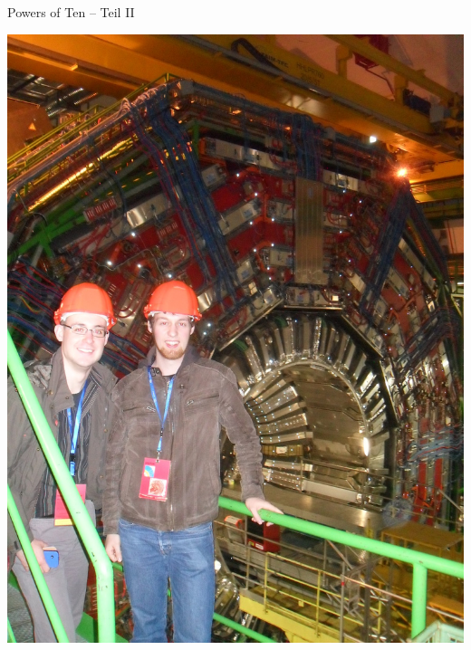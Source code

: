 \documentclass[14pt]{beamer}
\begin{document}
%
\begin{frame}
	\centering
	\huge{Powers of Ten -- Teil II}
\end{frame}

\begin{frame}
	\centering
	\includegraphics[height=0.8\textheight]{SDC13090.JPG}
\end{frame}
\end{document}
